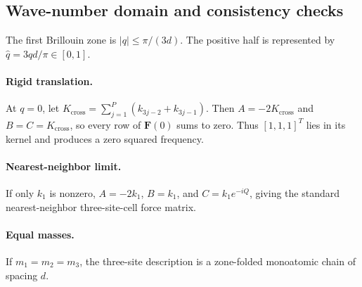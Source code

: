\subsection{Wave-number domain and consistency checks}

The first Brillouin zone is $|q|\leq\pi/(3d)$. The positive half is represented
by $\hat q=3qd/\pi\in[0,1]$.

\paragraph{Rigid translation.}
At $q=0$, let
$K_{\mathrm{cross}}=\sum_{j=1}^{P}(k_{3j-2}+k_{3j-1})$. Then
$A=-2K_{\mathrm{cross}}$ and $B=C=K_{\mathrm{cross}}$, so every row of
$\mathbf F(0)$ sums to zero. Thus $[1,1,1]^T$ lies in its kernel and produces a
zero squared frequency.

\paragraph{Nearest-neighbor limit.}
If only $k_1$ is nonzero, $A=-2k_1$, $B=k_1$, and $C=k_1e^{-iQ}$, giving the
standard nearest-neighbor three-site-cell force matrix.

\paragraph{Equal masses.}
If $m_1=m_2=m_3$, the three-site description is a zone-folded monoatomic chain
of spacing $d$.
